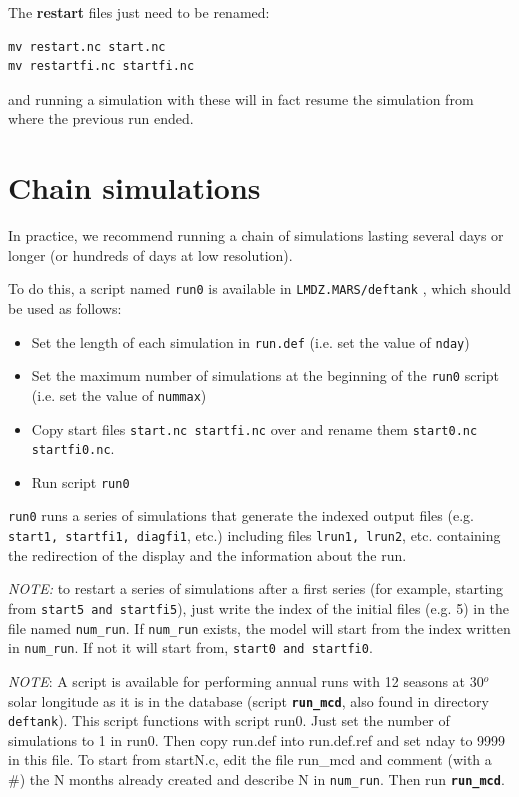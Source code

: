 \noindent
The {\bf restart} files just need to be renamed:
\begin{verbatim} 
mv restart.nc start.nc
mv restartfi.nc startfi.nc
\end{verbatim}
\noindent
and running a simulation with these will in fact resume the simulation
from where the previous run ended.

\section{Chain simulations}

In practice, we recommend running a chain of simulations lasting several
days or longer (or hundreds of days at low resolution).

To do this, a script named {\tt run0} is available in
\verb+LMDZ.MARS/deftank+ , which should be used as follows:
\begin{itemize}
\item Set the length of each simulation in {\tt run.def}
 (i.e. set the value of {\tt nday})
\item Set the maximum number of simulations at the beginning of the {\tt run0}
script (i.e. set the value of {\tt nummax})
\item Copy start files {\tt start.nc  startfi.nc} over and rename them
      {\tt start0.nc startfi0.nc}.
\item Run script {\tt run0} 
\end{itemize}

{\tt run0} runs a series of simulations that generate the indexed output
files (e.g. {\tt start1, startfi1, diagfi1}, etc.)
including files {\tt lrun1, lrun2}, etc. containing the redirection of the
display and the information about the run. 

{\it NOTE:} to restart a series of simulations after a first series
(for example, starting from {\tt start5 and  startfi5}), just write the
index of the initial files (e.g. 5) in the file named {\tt num\_run}.
If {\tt num\_run} exists, the model will start from the index written in
{\tt num\_run}. If not it will start from, {\tt start0 and startfi0}.


{\it NOTE}: A script is available for performing annual runs with 12 seasons
at 30$^o$ solar longitude
as it is in the database (script {\bf \tt run\_mcd}, also found in directory
{\tt deftank}).
This script functions with script run0. Just set the number of simulations to
1 in run0. Then copy run.def into run.def.ref and set nday to 9999 in this
file. To start from startN.c, edit the file run\_mcd and comment
(with a \#) the N months already created and describe N in {\tt num\_run}. 
Then run  {\bf \tt run\_mcd}.


